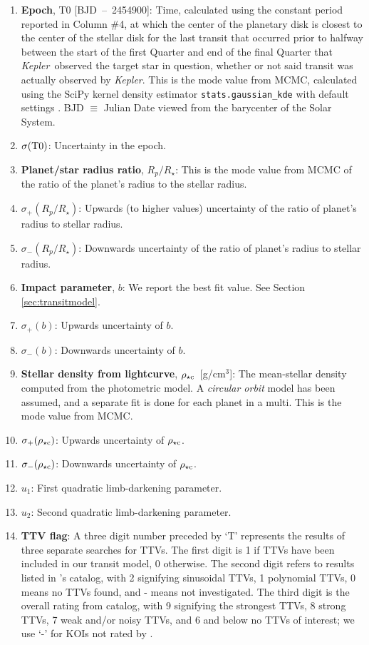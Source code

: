 \documentclass{aastex62}
\newcommand{\ikt}{{\it Kepler}}
\newcommand{\ik}{{\it Kepler~}}
\newcommand{\rhoc}{\ensuremath{\rho_{\star {\rm c}}}}
\begin{document}
\begin{enumerate}
    \item \textbf{Epoch}, T0 [BJD~--~2454900]:  Time, calculated using the constant period reported in Column \#4, at which the center of the planetary disk is closest to the center of the stellar disk for the last transit that occurred prior to halfway between the start of the first Quarter and end of the final Quarter that \ik observed the target star in question, whether or not said transit was actually observed by \ikt. This is the mode value from MCMC, calculated using the SciPy kernel density estimator \texttt{stats.gaussian\_kde} with default settings \citep{Virtanen:2020}.  
    BJD $\equiv$ Julian Date viewed from the barycenter of the Solar System. 
    \item \textbf{$\sigma({\rm T0})$}: Uncertainty in the epoch.
    \item \textbf{Planet/star radius ratio}, $R_p/R_\star$: This is the mode value from MCMC of the ratio of the planet's radius to the stellar radius.
    \item \textbf{$\sigma_+(R_p/R_\star)$}: Upwards (to higher values) uncertainty of the ratio of planet's radius to stellar radius.
    \item\textbf{$\sigma_-(R_p/R_\star)$}: Downwards uncertainty of the ratio of planet's radius to stellar radius.
   \item \textbf{Impact parameter}, $b$:  We report the best fit value. See Section \ref{sec:transitmodel}.
   \item \textbf{$\sigma_+(b)$}: Upwards uncertainty of $b$.
   \item \textbf{$\sigma_-(b)$}: Downwards uncertainty of $b$.
   \item \textbf{Stellar density from lightcurve}, \rhoc~[g/cm$^3$]: The mean-stellar density computed from the photometric model.  A \emph{circular orbit} model has been assumed, and a separate fit is done for each planet in a multi. This is the mode value from MCMC.
   \item \textbf{$\sigma_+(\rhoc)$}: Upwards uncertainty of \rhoc.
   \item \textbf{$\sigma_-(\rhoc)$}: Downwards uncertainty of \rhoc.
   \item \textbf{$u_1$}: First quadratic limb-darkening parameter.
   \item \textbf{$u_2$}: Second quadratic limb-darkening parameter.
   \item \textbf{TTV flag}: A three digit number preceded by `T' represents the results of three separate searches for TTVs. The first digit is 1 if TTVs have been included in our transit model, 0 otherwise. The second digit refers to results listed in \citet{Holczer:2016}'s catalog, with 2 signifying sinusoidal TTVs, 1 polynomial TTVs, 0 means no TTVs found, and - means not investigated. The third digit is  the overall rating from \citet{Kane:2019} catalog, with 9 signifying the strongest TTVs, 8 strong TTVs, 7 weak and/or noisy TTVs, and 6 and below no TTVs of interest; we use `-' for KOIs not rated by \citet{Kane:2019}.

\end{enumerate}
\end{document}

